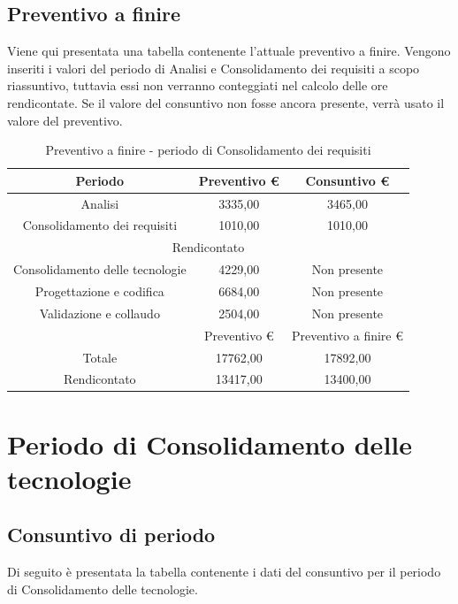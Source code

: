 \documentclass[./PianodiProgetto.tex]{subfiles}
\begin{document}
\subsection{Preventivo a finire}
Viene qui presentata una tabella contenente l'attuale preventivo a finire.
Vengono inseriti i valori del periodo di Analisi e Consolidamento dei requisiti a scopo riassuntivo, tuttavia essi non verranno conteggiati nel calcolo delle ore rendicontate. Se il valore del consuntivo non fosse ancora presente, verrà usato il valore del preventivo.

\begin{table}[H]
	\centering
	\begin{tabular}{|c|c|c|}
		\hline
		Periodo&Preventivo \euro{}&Consuntivo \euro{} \\ \hline
		Analisi&3335,00&3465,00  \\ \hline
		Consolidamento dei requisiti&1010,00&1010,00  \\ \hline
		\multicolumn{3}{|c|}{Rendicontato}  \\ \hline
		Consolidamento delle tecnologie&4229,00&Non presente  \\ \hline
		Progettazione e codifica&6684,00&Non presente  \\ \hline
		Validazione e collaudo&2504,00&Non presente  \\ \hline
		&Preventivo \euro{}&Preventivo a finire \euro{}  \\ \hline
		Totale&17762,00&17892,00 \\ \hline
		Rendicontato&13417,00&13400,00 \\ \hline
	\end{tabular}
	\caption{Preventivo a finire - periodo di Consolidamento dei requisiti}
\end{table}

\section{Periodo di Consolidamento delle tecnologie}
\subsection{Consuntivo di periodo}
Di seguito è presentata la tabella contenente i dati del consuntivo per il
periodo di Consolidamento delle tecnologie.
\end{document}
